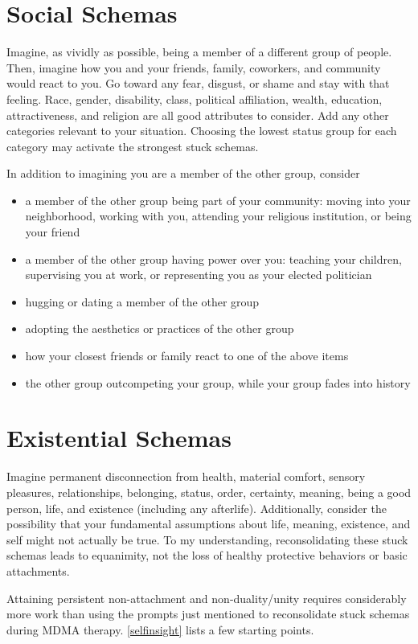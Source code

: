 \documentclass[11pt,oneside]{book}
\begin{document}
\section{Social Schemas}
\label{socialPrompts}
Imagine, as vividly as possible, being a member of a different group of people. Then, imagine how you and your friends, family, coworkers, and community would react to you. Go toward any fear, disgust, or shame and stay with that feeling. Race, gender, disability, class, political affiliation, wealth, education, attractiveness, and religion are all good attributes to consider. Add any other categories relevant to your situation. Choosing the lowest status group for each category may activate the strongest stuck schemas.

In addition to imagining you are a member of the other group, consider
\begin{itemize}
    \item a member of the other group being part of your community: moving into your neighborhood, working with you, attending your religious institution, or being your friend
    \item a member of the other group having power over you: teaching your children, supervising you at work, or representing you as your elected politician
    \item hugging or dating a member of the other group
    \item adopting the aesthetics or practices of the other group
    \item how your closest friends or family react to one of the above items
    \item the other group outcompeting your group, while your group fades into history
\end{itemize}

\section{Existential Schemas}
Imagine permanent disconnection from health, material comfort, sensory pleasures, relationships, belonging, status, order, certainty, meaning, being a good person, life, and existence (including any afterlife). Additionally, consider the possibility that your fundamental assumptions about life, meaning, existence, and self might not actually be true. To my understanding, reconsolidating these stuck schemas leads to equanimity, not the loss of healthy protective behaviors or basic attachments.

Attaining persistent non-attachment and non-duality/unity requires considerably more work than using the prompts just mentioned to reconsolidate stuck schemas during MDMA therapy. \cref{selfinsight} lists a few starting points.
\end{document}
